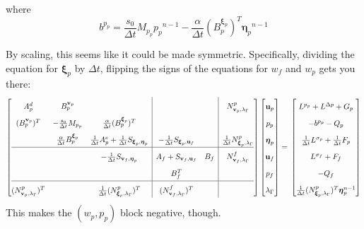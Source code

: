 \documentclass{article}
\newcommand{\mathspace}[1]{\ensuremath{#1}\xspace} %
\newcommand{\dt}{\mathspace{\Delta t}}
\newcommand{\matzero}{}        %
\newcommand{\uf}{\mathspace{\mathbf{u}_f}}
\newcommand{\vf}{\mathspace{\mathbf{v}_f}}
\newcommand{\up}{\mathspace{\mathbf{u}_p}}
\newcommand{\vp}{\mathspace{\mathbf{v}_p}}
\newcommand{\pf}{\mathspace{p_f}}
\newcommand{\pp}{\mathspace{p_p}}
\newcommand{\wf}{\mathspace{w_f}}
\renewcommand{\wp}{\mathspace{w_p}}
\newcommand{\disp}{\mathspace{\boldsymbol{\eta}_p}}
\newcommand{\disptest}{\mathspace{\boldsymbol{\xi}_p}}
\newcommand{\mult}{\mathspace{\lambda_{\Gamma}}}
\newcommand{\multtest}{\mathspace{\mu_{\Gamma}}}
\begin{document}
where
$$b^{\pp} = \frac {s_0}{\dt} M_{\pp} \pp^{n-1} - \frac {\alpha} {\dt} (B_p^{\disptest})^T \disp^{n-1}$$

By scaling, this seems like it could be made symmetric. Specifically, dividing the equation for \disptest by \dt, flipping the signs of the equations for \wf and \wp gets you there:
\[ \renewcommand{\arraystretch}{1.8}
  \left[\begin{array}{@{}ccc|cc|c@{}}
          
          A^d_p & B^{\vp}_p & \matzero & \matzero & \matzero & N^p_{\vp, \mult} \\ %
          (B^{\vp}_p)^T & -\frac {s_0}{\dt} M_{\pp} & \frac{\alpha}{\dt} (B^{\disptest}_p)^T & \matzero & \matzero & \matzero\\ %
          \matzero & \frac {\alpha} {\dt} B^{\disptest}_p & \frac 1 {\dt}A^e_p + \frac 1 {\dt} S_{\disptest, \disp} & -\frac 1 {\dt} S_{\disptest, \uf} & \matzero &\frac 1 {\dt} N^p_{\disptest, \mult}\\ %
          \hline
          \matzero & \matzero & - \frac 1 {\dt} S_{\vf, \disp} & A_f + S_{\vf, \uf} & B_f & N^f_{\vf, \mult}\\ %
          \matzero & \matzero & \matzero & B_f^T & \matzero & \matzero \\ %
          \hline
          (N^p_{\vp, \mult})^T & \matzero & \frac 1 {\dt} (N^p_{\disptest, \mult})^T & (N^f_{\vf, \mult})^T & \matzero & \matzero \\ %

        \end{array}\right]
      \left[\begin{array}{@{}c@{}}
                \up \\
                \pp \\
                \disp \\
                \uf \\
                \pf \\
                \mult
            \end{array}\right]
          = \newline
                      \left[\begin{array}{@{}c@{}}
                L^{\pp} + L^{\Delta p}  + G_p\\
                              -b^{\pp} - Q_p\\
                              \frac 1 {\dt}L^{\sigma_p} + \frac 1 {\dt} F_p\\
                L^{\sigma_f} + F_f\\
                - Q_f\\
                \frac 1 {\dt} (N^p_{\disptest, \mult})^T \disp^{n-1} \\
        \end{array}\right]
\]
This makes the $(\wp, \pp)$ block negative, though.
\end{document}
